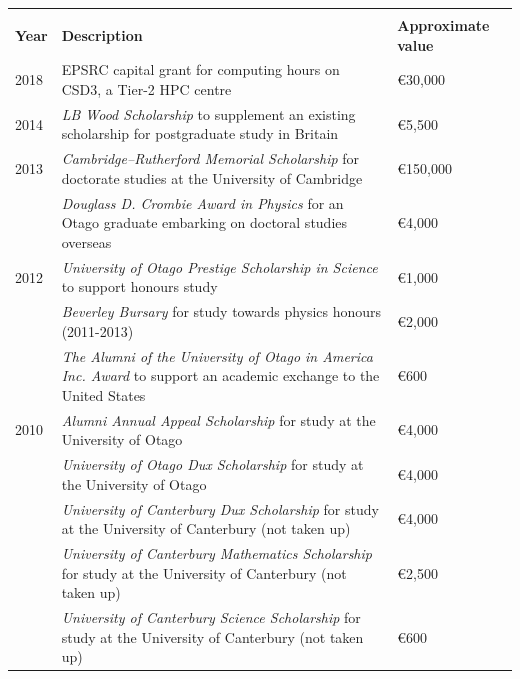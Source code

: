 \documentclass[10pt,a4paper,final]{article}
\begin{document}
\begin{tabularx}{\textwidth}{
   m{}%
   m{}%
   >{\raggedleft\arraybackslash}m{}}
   \rowcolor{seaborn_blue}
   \multicolumn{3}{l}{\large\textcolor{seaborn_bg_grey_half}{\textbf{Grants and Scholarships}}}                                                                           \\
   \textbf{Year} & \textbf{Description}                                                                                                      & \textbf{Approximate value} \\
   2018          & EPSRC capital grant for computing hours on CSD3, a Tier-2 HPC centre                                                      & \euro30,000                \\
   {2014}        & \textit{LB Wood Scholarship} to supplement an existing scholarship for postgraduate study in Britain                      & \euro5,500                 \\
   {2013}        & \textit{Cambridge--Rutherford Memorial Scholarship} for doctorate studies at the University of Cambridge                  & \euro150,000               \\
                 & \textit{Douglass D. Crombie Award in Physics} for an Otago graduate embarking on doctoral studies overseas                & \euro 4,000                \\
   {2012}        & \textit{University of Otago Prestige Scholarship in Science} to support honours study                                     & \euro1,000                 \\
                 & \textit{Beverley Bursary} for study towards physics honours (2011-2013)                                                   & \euro2,000                 \\
                 & \textit{The Alumni of the University of Otago in America Inc. Award} to support an academic exchange to the United States & \euro600                   \\
   {2010}        & \textit{Alumni Annual Appeal Scholarship} for study at the University of Otago                                            & \euro4,000                 \\
                 & \textit{University of Otago Dux Scholarship} for study at the University of Otago                                         & \euro4,000                 \\
                 & \textit{University of Canterbury Dux Scholarship} for study at the University of Canterbury (not taken up)                & \euro4,000                 \\
                 & \textit{University of Canterbury Mathematics Scholarship} for study at the University of Canterbury (not taken up)        & \euro2,500                 \\
                 & \textit{University of Canterbury Science Scholarship} for study at the University of Canterbury (not taken up)            & \euro600                   \\
\end{tabularx}
\end{document}
